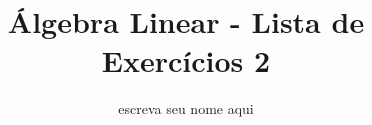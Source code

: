 \documentclass[leqno]{article}
\begin{document}
\newtheorem{teo}{Teorema}[section] \newtheorem*{teo*}{Teorema}
\newtheorem{prop}[teo]{Proposição} \newtheorem*{prop*}{Proposição}
\newtheorem{lema}[teo]{Lemma} \newtheorem*{lema*}{Lema}
\newtheorem{cor}[teo]{Corolário} \newtheorem*{cor*}{Corolário}

\theoremstyle{definition}
\newtheorem{defi}[teo]{Definição} \newtheorem*{defi*}{Definição}
\newtheorem{exem}[teo]{Exemplo} \newtheorem*{exem*}{Exemplo}
\newtheorem{obs}[teo]{Observação} \newtheorem*{obs*}{Observação}
\newtheorem*{hipo}{Hipóteses}
\newtheorem*{nota}{Notação}

\newcommand{\ds}{\displaystyle} \newcommand{\nl}{\newline}
\newcommand{\eps}{\varepsilon} \newcommand{\ssty}{\scriptstyle}
\newcommand{\bE}{\mathbb{E}}
\newcommand{\cB}{\mathcal{B}}
\newcommand{\cF}{\mathcal{F}}
\newcommand{\cA}{\mathcal{A}}
\newcommand{\cM}{\mathcal{M}}
\newcommand{\cD}{\mathcal{D}}
\newcommand{\cN}{\mathcal{N}}
\newcommand{\cL}{\mathcal{L}}
\newcommand{\cLN}{\mathcal{LN}}
\newcommand{\bP}{\mathbb{P}}
\newcommand{\bQ}{\mathbb{Q}}
\newcommand{\bN}{\mathbb{N}}
\newcommand{\bR}{\mathbb{R}}
\newcommand{\bZ}{\mathbb{Z}}

\newcommand{\bfw}{\mathbf{w}}
\newcommand{\bfv}{\mathbf{v}}
\newcommand{\bfu}{\mathbf{u}}

\newenvironment{sol}
{
    \vspace{4mm}
    \noindent\textbf{Resolução:}
    \strut\newline
    \smallskip
    \hspace{-3.5mm}
}
{}

\newcommand{\bvecc}[2]{%
  \begin{bmatrix} #1 \\ #2  \end{bmatrix}
}
\newcommand{\bveccc}[3]{%
  \begin{bmatrix} #1 \\ #2 \\ #3  \end{bmatrix}
}


\title{Álgebra Linear - Lista de Exercícios 2}

\author{escreva seu nome aqui}

\date{}

\maketitle
\end{document}
